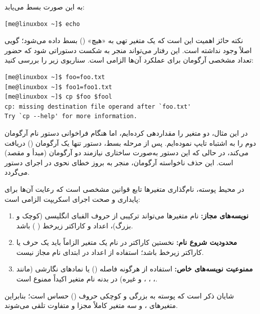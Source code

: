 به این صورت بسط می‌یابد:

\begin{latin}
\begin{lstlisting}
[me@linuxbox ~]$ echo
\end{lstlisting}
\end{latin}

نکته حائز اهمیت این است که یک متغیر تهی به «هیچ» () بسط داده می‌شود؛ گویی اصلاً وجود نداشته است. این رفتار می‌تواند منجر به شکست دستوراتی شود که حضور تعداد مشخصی آرگومان برای عملکرد آن‌ها الزامی است. سناریوی زیر را بررسی کنید:

\begin{latin}
\begin{lstlisting}
[me@linuxbox ~]$ foo=foo.txt
[me@linuxbox ~]$ foo1=foo1.txt
[me@linuxbox ~]$ cp $foo $fool
cp: missing destination file operand after `foo.txt'
Try `cp --help' for more information.
\end{lstlisting}
\end{latin}

در این مثال، دو متغیر را مقداردهی کرده‌ایم، اما هنگام فراخوانی دستور  نام آرگومان دوم را به اشتباه تایپ نموده‌ایم. پس از مرحله بسط، دستور  تنها یک آرگومان () دریافت می‌کند، در حالی که این دستور به‌صورت ساختاری نیازمند دو آرگومان (مبدأ و مقصد) است. این حذف ناخواسته آرگومان، منجر به بروز خطای نحوی در اجرای دستور می‌گردد.

در محیط پوسته، نام‌گذاری متغیرها تابع قوانین مشخصی است که رعایت آن‌ها برای پایداری و صحت اجرای اسکریپت الزامی است:

\begin{enumerate}
  \item \textbf{نویسه‌های مجاز:} نام متغیرها می‌تواند ترکیبی از حروف الفبای انگلیسی (کوچک و بزرگ)، اعداد و کاراکتر زیرخط ( \cmd{\_}) باشد.
  \item \textbf{محدودیت شروع نام:} نخستین کاراکتر در نام یک متغیر الزاماً باید یک حرف یا کاراکتر زیرخط باشد؛ استفاده از اعداد در ابتدای نام مجاز نیست.
  \item \textbf{ممنوعیت نویسه‌های خاص:} استفاده از هرگونه فاصله () یا نمادهای نگارشی (مانند ، \cmd{\#}، \cmd{\$}، \cmd{\%} و غیره) در بدنه نام متغیر اکیداً ممنوع است.
\end{enumerate}

شایان ذکر است که پوسته به بزرگی و کوچکی حروف () حساس است؛ بنابراین متغیرهای ،  و  سه متغیر کاملاً مجزا و متفاوت تلقی می‌شوند.

